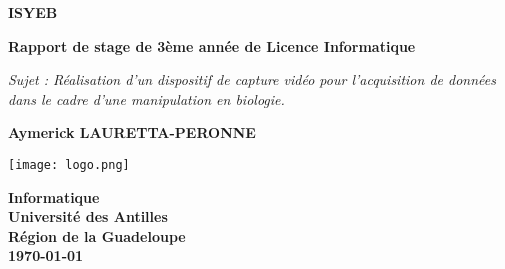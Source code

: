 \begin{titlepage}
    \begin{center}
        \vspace*{1cm}

        \textbf{\Huge{ISYEB}}

        \vspace{0.5cm}

        \textbf{Rapport de stage de 3ème année de Licence Informatique} 

        \vspace{0.5cm}

        \small{\textit{Sujet : Réalisation d'un dispositif de capture vidéo pour l’acquisition de données dans le cadre d’une manipulation en biologie.}}

        \vspace{1.5cm}

        \textbf{Aymerick LAURETTA-PERONNE} \\

        \vfill


        \vspace{0.8cm}

        \texttt{[image: logo.png]}
        
        \textbf{Informatique} \\
        \textbf{Université des Antilles} \\
        \textbf{Région de la Guadeloupe} \\
        \vspace{0.5cm}
        \textbf{\today {}}
         
    \end{center}
\end{titlepage}
